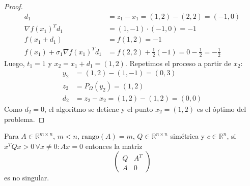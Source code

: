 \documentclass{article}
\newenvironment{theorem}[2][Ejercicio]{\begin{trivlist}
\item[\hskip \labelsep {\bfseries #1}\hskip \labelsep {\bfseries #2.}]}{\end{trivlist}}
\begin{document}
\begin{proof}
\begin{align*}
        d_1                                     & = z_1 - x_1 = (1,2) - (2,2) = (-1,0)                        \\
        {\nabla f(x_1)}^T d_1                   & = (1,-1) \cdot (-1,0) = -1                                  \\
        f(x_1 + d_1)                            & = f(1,2) = -1                                               \\
        f(x_1) + \sigma_1 {\nabla f(x_1)}^T d_1 & = f(2,2) + \frac{1}{2}(-1) = 0 - \frac{1}{2} = -\frac{1}{2}
    \end{align*}
    Luego, \( t_1 = 1 \) y \( x_2 = x_1 + d_1 = (1,2) \). Repetimos el proceso a partir de \( x_2 \): \begin{align*}
        y_2 & = (1,2) - (1,-1) = (0,3)            \\
        z_2 & = P_{\Omega}(y_2) = (1,2)           \\
        d_2 & = z_2 - x_2 = (1,2) - (1,2) = (0,0)
    \end{align*}
    Como \( d_2 = 0 \), el algoritmo se detiene y el punto \( x_2 = (1,2) \) es el óptimo del problema.
\end{proof}

\begin{theorem}{2}
    Para \(A \in \mathbb{R}^{m \times n}\), \(m < n\), \(\text{rango}(A) = m\), \(Q \in \mathbb{R}^{n \times n}\) simétrica y \(c \in \mathbb{R}^n\), si \(x^T Q x > 0 \, \forall x \neq 0 : Ax = 0\) entonces la matriz
    \[
        \begin{pmatrix}
            Q & A^T \\
            A & 0
        \end{pmatrix}
    \]
    es no singular.
\end{theorem}
\end{document}
